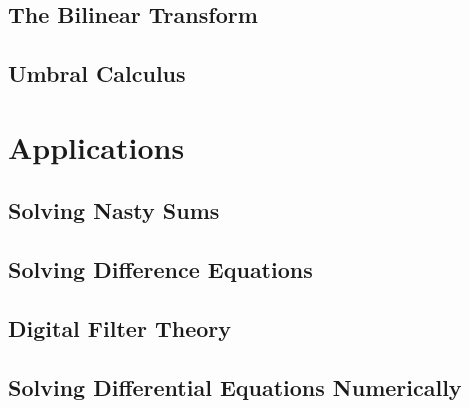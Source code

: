 

\subsection{The Bilinear Transform}


\subsection{Umbral Calculus}










\section{Applications}

\subsection{Solving Nasty Sums}

\subsection{Solving Difference Equations}

\subsection{Digital Filter Theory}


\subsection{Solving Differential Equations Numerically}

